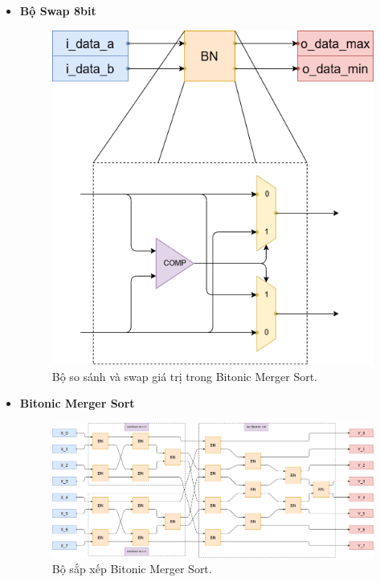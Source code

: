 \begin{itemize}[label=-]
	\item \textbf{Bộ Swap 8bit}
	
	\begin{figure}[H]
		\centering
		\includegraphics[width=.4\linewidth]{./my-chapters/my-diagrams/Question6/Swap_and_compare.png}
		\caption{Bộ so sánh và swap giá trị trong Bitonic Merger Sort.}
	\end{figure}

	\item \textbf{Bitonic Merger Sort}
	
	\begin{figure}[H]
		\centering
		\includegraphics[width=\linewidth]{./my-chapters/my-diagrams/Question6/debai.png}
		\caption{Bộ sắp xếp Bitonic Merger Sort.}
	\end{figure}
\end{itemize}








